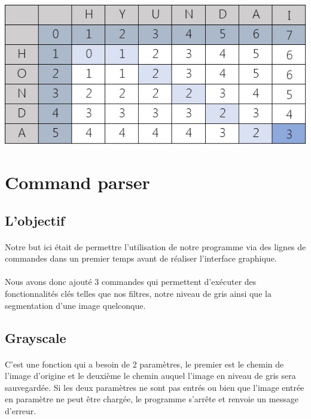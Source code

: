 \documentclass{article}
\begin{document}
\begin{center}
	\includegraphics[scale=0.45]{matrice}
\end{center}


\newpage
{}
\section{Command parser}

\subsection{L'objectif}

\paragraph{}Notre but ici était de permettre l'utilisation de notre programme via des lignes de commandes dans un premier temps avant de réaliser l'interface graphique.

\paragraph{}Nous avons donc ajouté 3 commandes qui permettent d'exécuter des fonctionnalités clés telles que nos filtres, notre niveau de gris ainsi que la segmentation d'une image quelconque.

\subsection{Grayscale}

\paragraph{}C'est une fonction qui a besoin de 2 paramètres, le premier est le chemin de l'image d'origine et le deuxième le chemin auquel l'image en niveau de gris sera sauvegardée. Si les deux paramètres ne sont pas entrés ou bien que l'image entrée en paramètre ne peut être chargée, le programme s'arrête et renvoie un message d'erreur.
\end{document}
